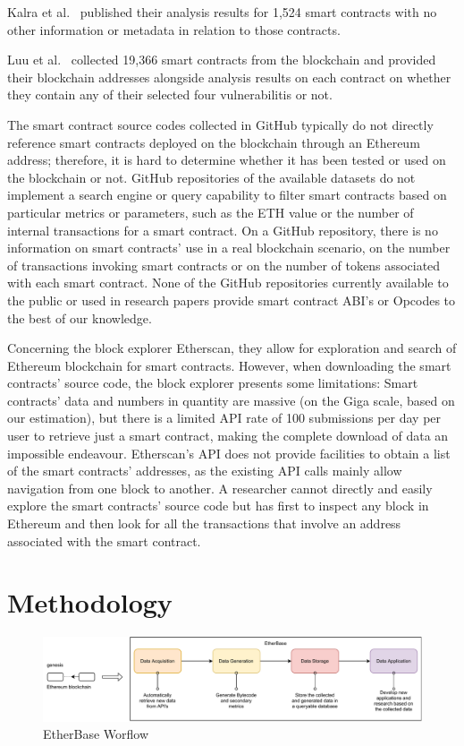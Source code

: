 	Kalra et al.~\cite{kalra2018zeus} published their analysis results for 1,524 smart contracts with no other information or metadata in relation to those contracts.

	Luu et al.~\cite{oyente} collected 19,366 smart contracts from the blockchain and provided their blockchain addresses alongside analysis results on each contract on whether they contain any of their selected four vulnerabilitis or not.

	The smart contract source codes collected in GitHub typically do not directly reference smart contracts deployed on the blockchain through an Ethereum address;
	therefore, it is hard to determine whether it has been tested or used on the blockchain or not.
	GitHub repositories of the available datasets do not implement a search engine or query capability to filter smart contracts based on particular metrics or parameters, such as the ETH value or the number of internal transactions for a smart contract.
	On a GitHub repository, there is no information on smart contracts' use in a real blockchain scenario, on the number of transactions invoking smart contracts or on the number of tokens associated with each smart contract.
	None of the GitHub repositories currently available to the public or used in research papers provide smart contract ABI's or Opcodes to the best of our knowledge.
	
	Concerning the block explorer Etherscan, they allow for exploration and search of Ethereum blockchain for smart contracts.
	However, when downloading the smart contracts' source code, the block explorer presents some limitations: 
	Smart contracts' data and numbers in quantity are massive (on the Giga scale, based on our estimation), but there is a limited API rate of 100 submissions per day per user to retrieve just a smart contract, making the complete download of data an impossible endeavour.
	Etherscan's API does not provide facilities to obtain a list of the smart contracts' addresses, as the existing API calls mainly allow navigation from one block to another.
	A researcher cannot directly and easily explore the smart contracts' source code but has first to inspect any block in Ethereum and then look for all the transactions that involve an address associated with the smart contract.

\section{Methodology}

	\begin{figure}[t]
		\centering
		\includegraphics[width=1\textwidth]{figures/Untitled Diagram.pdf}
		\caption{EtherBase Worflow}
		\label{fig:my_label}
	\end{figure}
	
